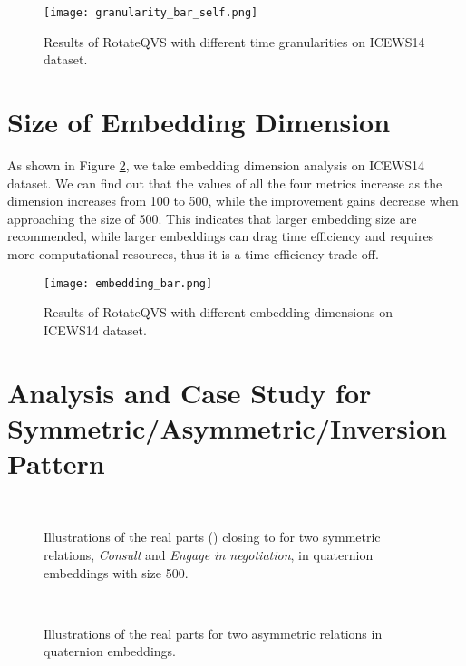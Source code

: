 \documentclass[11pt]{article}
\begin{document}
\begin{figure}[!t]
\centering
\texttt{[image: granularity\_bar\_self.png]} 
\caption{Results of RotateQVS with different time granularities on ICEWS14 dataset.}
\label{figure:granularity}
\end{figure}

\section{Size of Embedding Dimension}
\label{app:dimension}

As shown in Figure \ref{figure:dimension}, we take embedding dimension analysis on ICEWS14 dataset. We can find out that the values of all the four metrics increase as the dimension increases from 100 to 500, while the improvement gains decrease when approaching the size of 500.
This indicates that larger embedding size are recommended, while larger embeddings can drag time efficiency and requires more computational resources, thus it is a time-efficiency trade-off.

\begin{figure}[!t]
\centering
\texttt{[image: embedding\_bar.png]} 
\caption{Results of RotateQVS with different embedding dimensions on ICEWS14 dataset.}
\label{figure:dimension}
\end{figure}


\section{Analysis and Case Study for Symmetric/Asymmetric/Inversion Pattern}
\label{app:case_study_3}

\begin{figure}[!t]
  \centering
	 \\
  \caption{Illustrations of the real parts () closing to  for two symmetric relations, \emph{Consult} and \emph{Engage in negotiation}, in quaternion embeddings with size 500.}
	\label{figure:sym}
\end{figure}

\begin{figure}[!t]
  \centering
	 \\
  \caption{Illustrations of the real parts  for two asymmetric relations in quaternion embeddings.
}
	\label{figure:asym}
\end{figure}
\end{document}
